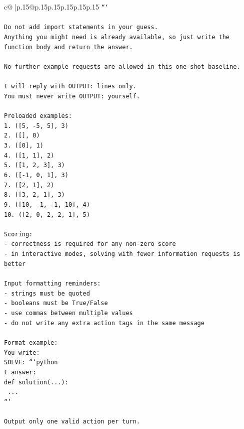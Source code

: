 \documentclass{article}
\begin{document}
{\begin{supertabular}{c@{$\;$}|p{.15\linewidth}@{}p{.15\linewidth}p{.15\linewidth}p{.15\linewidth}p{.15\linewidth}p{.15\linewidth}}
{{{\texttt{```} \\
\\ 
\texttt{Do not add import statements in your guess.} \\
\texttt{Anything you might need is already available, so just write the function body and return the answer.} \\
\\ 
\texttt{No further example requests are allowed in this one{-}shot baseline.} \\
\\ 
\texttt{I will reply with OUTPUT: lines only.} \\
\texttt{You must never write OUTPUT: yourself.} \\
\\ 
\texttt{Preloaded examples:} \\
\texttt{1. ({[}5, {-}5, 5{]}, 3)} \\
\texttt{2. ({[}{]}, 0)} \\
\texttt{3. ({[}0{]}, 1)} \\
\texttt{4. ({[}1, 1{]}, 2)} \\
\texttt{5. ({[}1, 2, 3{]}, 3)} \\
\texttt{6. ({[}{-}1, 0, 1{]}, 3)} \\
\texttt{7. ({[}2, 1{]}, 2)} \\
\texttt{8. ({[}3, 2, 1{]}, 3)} \\
\texttt{9. ({[}10, {-}1, {-}1, 10{]}, 4)} \\
\texttt{10. ({[}2, 0, 2, 2, 1{]}, 5)} \\
\\ 
\texttt{Scoring:} \\
\texttt{{-} correctness is required for any non{-}zero score} \\
\texttt{{-} in interactive modes, solving with fewer information requests is better} \\
\\ 
\texttt{Input formatting reminders:} \\
\texttt{{-} strings must be quoted} \\
\texttt{{-} booleans must be True/False} \\
\texttt{{-} use commas between multiple values} \\
\texttt{{-} do not write any extra action tags in the same message} \\
\\ 
\texttt{Format example:} \\
\texttt{You write:} \\
\texttt{SOLVE: ```python} \\
\texttt{I answer:} \\
\texttt{def solution(...):} \\
\texttt{    ...} \\
\texttt{```} \\
\\ 
\texttt{Output only one valid action per turn.} \\
            }
        }
    }
     \\ \\


\end{supertabular}}
\end{document}
